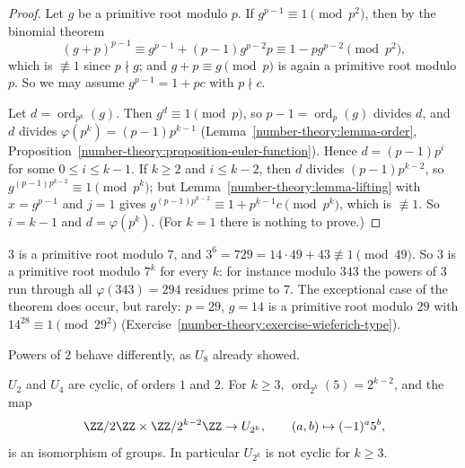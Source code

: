 \begin{proof}
Let $g$ be a primitive root modulo $p$. If $g^{p-1} \equiv 1 \pmod{p^2}$, then by the binomial theorem
\[
(g + p)^{p-1} \equiv g^{p-1} + (p - 1)g^{p-2}p \equiv 1 - pg^{p-2} \pmod{p^2},
\]
which is $\not\equiv 1$ since $p \nmid g$; and $g + p \equiv g \pmod p$ is again a primitive root modulo $p$. So we may assume $g^{p-1} = 1 + pc$ with $p \nmid c$.

Let $d = \operatorname{ord}_{p^k}(g)$. Then $g^d \equiv 1 \pmod p$, so $p - 1 = \operatorname{ord}_p(g)$ divides $d$, and $d$ divides $\varphi(p^k) = (p - 1)p^{k-1}$
(Lemma~\ref{number-theory:lemma-order}, Proposition~\ref{number-theory:proposition-euler-function}). Hence $d = (p - 1)p^i$ for some $0 \leq i \leq k - 1$. If $k \geq 2$ and $i \leq k - 2$, then $d$ divides
$(p - 1)p^{k-2}$, so $g^{(p-1)p^{k-2}} \equiv 1 \pmod{p^k}$; but Lemma~\ref{number-theory:lemma-lifting} with $x = g^{p-1}$ and $j = 1$ gives $g^{(p-1)p^{k-2}} \equiv 1 + p^{k-1}c \pmod{p^k}$, which is
$\not\equiv 1$. So $i = k - 1$ and $d = \varphi(p^k)$. (For $k = 1$ there is nothing to prove.)
\end{proof}

\begin{example}\label{number-theory:example-primitive-root-power}
$3$ is a primitive root modulo $7$, and $3^6 = 729 = 14 \cdot 49 + 43 \not\equiv 1 \pmod{49}$. So $3$ is a primitive root modulo $7^k$ for every $k$: for instance modulo $343$ the powers of $3$ run through
all $\varphi(343) = 294$ residues prime to $7$. The exceptional case of the theorem does occur, but rarely: $p = 29$, $g = 14$ is a primitive root modulo $29$ with $14^{28} \equiv 1 \pmod{29^2}$
(Exercise~\ref{number-theory:exercise-wieferich-type}).
\end{example}

Powers of $2$ behave differently, as $U_8$ already showed.

\begin{theorem}\label{number-theory:theorem-units-two-power}
$U_2$ and $U_4$ are cyclic, of orders $1$ and $2$. For $k \geq 3$, $\operatorname{ord}_{2^k}(5) = 2^{k-2}$, and the map
\[
\ZZ/2\ZZ \times \ZZ/2^{k-2}\ZZ \to U_{2^k}, \qquad (a, b) \mapsto (-1)^a5^b,
\]
is an isomorphism of groups. In particular $U_{2^k}$ is not cyclic for $k \geq 3$.
\end{theorem}

